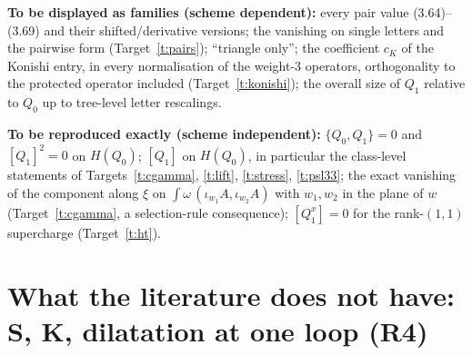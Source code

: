 \documentclass[11pt]{article}
\theoremstyle{definition}
\begin{document}
\textbf{To be displayed as families (scheme dependent):} every pair value (3.64)--(3.69) and their shifted/derivative versions; the vanishing on single letters and the pairwise form (Target~\ref{t:pairs}); ``triangle only''; the coefficient $c_K$ of the Konishi entry, in every normalisation of the weight-$3$ operators, orthogonality to the protected operator included (Target~\ref{t:konishi}); the overall size of $Q_1$ relative to $Q_0$ up to tree-level letter rescalings.

\textbf{To be reproduced exactly (scheme independent):} $\{Q_0,Q_1\}=0$ and $[Q_1]^2=0$ on $H(Q_0)$; $[Q_1]$ on $H(Q_0)$, in particular the class-level statements of Targets~\ref{t:cgamma}, \ref{t:lift}, \ref{t:stress}, \ref{t:psl33}; the exact vanishing of the component along $\xi$ on $\int\omega\,(\iota_{w_1}A,\iota_{w_2}A)$ with $w_1,w_2$ in the plane of $w$ (Target~\ref{t:cgamma}, a selection-rule consequence); $[Q_1^x]=0$ for the rank-$(1,1)$ supercharge (Target~\ref{t:ht}).

\section{What the literature does not have: S, K, dilatation at one loop (R4)}
\end{document}
